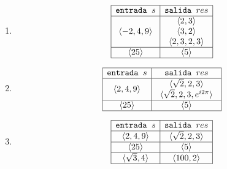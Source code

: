 \documentclass[12pt,a4paper,spanish]{article}
\begin{document}
\begin{enumerate}[label=\alph*)]
	\item

	      \def\salidaLarga{
		      \begin{array}{c}
			      \secuencia{2, 3}       \\
			      \secuencia{3, 2}       \\
			      \secuencia{2, 3, 2, 3} \\
		      \end{array}
	      }
	      \[
		      \begin{array}{|c|c|}
			      \hline
			      \texttt{entrada } s  & \texttt{salida } res \\  \hline
			      \secuencia{-2, 4, 9} & \salidaLarga         \\ \hline
			      \secuencia{25}       & \secuencia{5}        \\ \hline
		      \end{array}
	      \]

	\item

	      \def\salidaLarga{
		      \begin{array}{c}
			      \secuencia{\sqrt{2}, 2, 3}            \\
			      \secuencia{\sqrt{2}, 2, 3, e^{i2\pi}} \\
		      \end{array}
	      }
	      \[
		      \begin{array}{|c|c|}
			      \hline
			      \texttt{entrada } s & \texttt{salida } res \\  \hline
			      \secuencia{2, 4, 9} & \salidaLarga         \\ \hline
			      \secuencia{25}      & \secuencia{5}        \\ \hline
		      \end{array}
	      \]

	\item

	      \def\salidaLarga{
		      \begin{array}{c}
			      \secuencia{\sqrt{2}, 2, 3} \\
		      \end{array}
	      }
	      \[
		      \begin{array}{|c|c|}
			      \hline
			      \texttt{entrada } s    & \texttt{salida } res \\  \hline
			      \secuencia{2, 4, 9}    & \salidaLarga         \\ \hline
			      \secuencia{25}         & \secuencia{5}        \\ \hline
			      \secuencia{\sqrt{3},4} & \secuencia{100, 2}   \\ \hline
		      \end{array}
	      \]
\end{enumerate}
\end{document}
